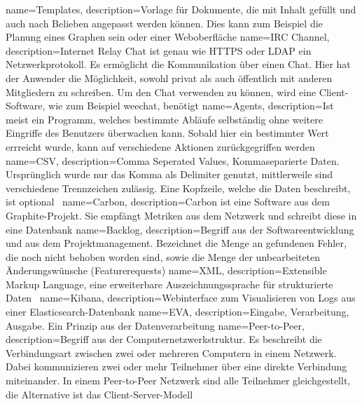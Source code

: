 {
  name=Templates,
  description={Vorlage für Dokumente, die mit Inhalt
               gefüllt und auch nach Belieben angepasst werden können. Dies
               kann zum Beispiel die Planung eines Graphen sein oder einer
               Weboberfläche}
}
{
  name=IRC Channel,
  description={Internet Relay Chat ist genau wie \gls{HTTPS} oder \gls{LDAP}
              ein Netzwerkprotokoll. Es ermöglicht die Kommunikation über einen
              Chat. Hier hat der Anwender die Möglichkeit, sowohl privat als
              auch öffentlich mit anderen Mitgliedern zu schreiben. Um den Chat
              verwenden zu können, wird eine Client-Software, wie zum Beispiel
              weechat, benötigt}
}
{
  name=Agents,
  description={Ist meist ein Programm, welches bestimmte Abläufe selbständig
              ohne weitere Eingriffe des Benutzers überwachen kann. Sobald
              hier ein bestimmter Wert errreicht wurde, kann auf
              verschiedene Aktionen zurückgegriffen werden}
}
{
  name=CSV,
  description={Comma Seperated Values, Kommaseparierte Daten. Ursprünglich
               wurde nur das Komma als Delimiter genutzt, mittlerweile sind
               verschiedene Trennzeichen zulässig. Eine Kopfzeile, welche die
               Daten beschreibt, ist optional~\cite{RFC4180}}
}
{
  name=Carbon,
  description={Carbon ist eine Software aus dem Graphite-Projekt. Sie empfängt
               Metriken aus dem Netzwerk und schreibt diese in eine Datenbank}
}
{
  name=Backlog,
  description={Begriff aus der Softwareentwicklung und aus dem
               Projektmanagement. Bezeichnet die Menge an gefundenen Fehler,
               die noch nicht behoben worden sind, sowie die Menge der
               unbearbeiteten Änderungswünsche (Featurerequests)}
}
{
  name=XML,
  description={Extensible Markup Language, eine erweiterbare
               Auszeichnungssprache für strukturierte
               Daten~\cite{xml_definition}}
}
{
  name=Kibana,
  description={Webinterface zum Visualisieren von Logs aus einer
               Elasticsearch-Datenbank}
}
{
  name=EVA,
  description={Eingabe, Verarbeitung, Ausgabe. Ein Prinzip aus der
               Datenverarbeitung}
}
{
  name=Peer-to-Peer,
  description={Begriff aus der Computernetzwerkstruktur. Es beschreibt die
               Verbindungsart zwischen zwei oder mehreren Computern in einem
               Netzwerk. Dabei kommunizieren zwei oder mehr Teilnehmer über
               eine direkte Verbindung miteinander. In einem Peer-to-Peer
               Netzwerk sind alle Teilnehmer gleichgestellt, die Alternative
               ist das Client-Server-Modell}
}
